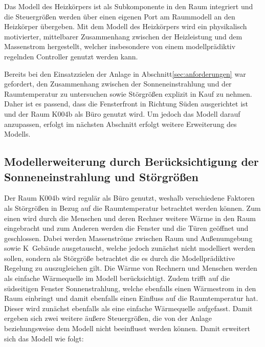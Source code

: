 

Das Modell des Heizkörpers ist als Subkomponente in den Raum integriert und die Steuergrößen werden über einen eigenen Port am Raummodell an den Heizkörper übergeben. Mit dem Modell des Heizkörpers wird ein physikalisch motivierter, mittelbarer Zusammenhang zwischen der Heizleistung und dem Massenstrom hergestellt, welcher insbesondere von einem modellprädiktiv regelnden Controller genutzt werden kann.

Bereits bei den Einsatzzielen der Anlage in Abschnitt\ref{sec:anforderungen} war gefordert, den Zusammenhang zwischen der Sonneneinstrahlung und der Raumtemperatur zu untersuchen sowie Störgrößen explizit in Kauf zu nehmen. Daher ist es passend, dass die Fensterfront in Richtung Süden ausgerichtet ist und der Raum K004b als Büro genutzt wird. Um jedoch das Modell darauf anzupassen, erfolgt im nächsten Abschnitt erfolgt weitere Erweiterung des Modells.


\subsection{Modellerweiterung durch Berücksichtigung der Sonneneinstrahlung und Störgrößen}
\label{sub:modsonne}

Der Raum K004b wird regulär als Büro genutzt, weshalb verschiedene Faktoren als Störgrößen in Bezug auf die Raumtemperatur betrachtet werden können. Zum einen wird durch die Menschen und deren Rechner weitere Wärme in den Raum eingebracht und zum Anderen werden die Fenster und die Türen geöffnet und geschlossen. Dabei werden Massenströme zwischen Raum und Außenumgebung sowie K~Gebäude ausgetauscht, welche jedoch zunächst nicht modelliert werden sollen, sondern als Störgröße betrachtet die es durch die Modellprädiktive Regelung zu auszugleichen gilt. Die Wärme von Rechnern und Menschen werden als einfache Wärmequelle im Modell berücksichtigt. 
Zudem trifft auf die südseitigen Fenster Sonnenstrahlung, welche ebenfalls einen Wärmestrom in den Raum einbringt und damit ebenfalls einen Einfluss auf die Raumtemperatur hat. Dieser wird zunächst ebenfalls als eine einfache Wärmequelle aufgefasst.
Damit ergeben sich zwei weitere äußere Steuergrößen, die von der Anlage beziehungsweise dem Modell nicht beeinflusst werden können. Damit erweitert sich das Modell wie folgt:

